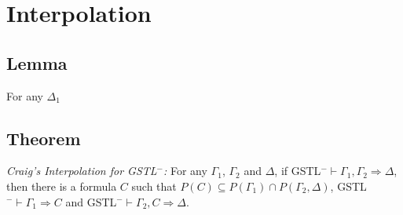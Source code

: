 \section{Interpolation}

\subsection{Lemma} For any $\Delta_1$

\subsection{Theorem} \textit{Craig's Interpolation for GSTL$^-$: } For any $\Gamma_1$, $\Gamma_2$ and $\Delta$, if GSTL$^-\vdash \Gamma_1 , \Gamma_2 \Rightarrow \Delta$, then there is a formula $C$ such that $P(C) \subseteq P(\Gamma_1) \cap P(\Gamma_2 , \Delta)$, GSTL$^-\vdash \Gamma_1 \Rightarrow C$ and GSTL$^-\vdash \Gamma_2 , C \Rightarrow \Delta$.

